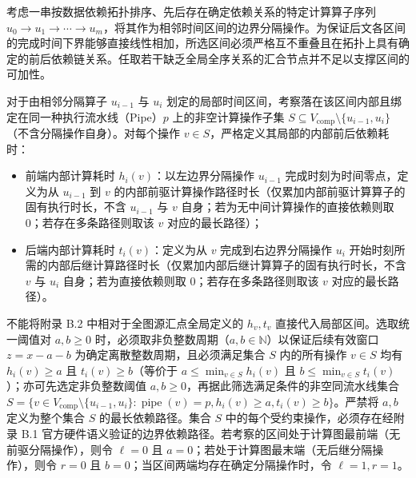 \documentclass[anonymous,notoc]{gmcm2026}
\providecommand{\tightlist}{\setlength{\itemsep}{0pt}\setlength{\parskip}{0pt}}
\begin{document}
考虑一串按数据依赖拓扑排序、先后存在确定依赖关系的特定计算算子序列 \(u_0 \to u_1 \to \cdots \to u_m\)，将其作为相邻时间区间的边界分隔操作。为保证后文各区间的完成时间下界能够直接线性相加，所选区间必须严格互不重叠且在拓扑上具有确定的前后依赖链关系。任取若干缺乏全局全序关系的汇合节点并不足以支撑区间的可加性。

对于由相邻分隔算子 \(u_{i-1}\) 与 \(u_i\) 划定的局部时间区间，考察落在该区间内部且绑定在同一种执行流水线（Pipe）\(p\) 上的非空计算操作子集 \(S \subseteq V_{\mathrm{comp}} \setminus \{u_{i-1}, u_i\}\)（不含分隔操作自身）。对每个操作 \(v \in S\)，严格定义其局部的内部前后依赖耗时：

\begin{itemize}
\tightlist
\item
  前端内部计算耗时 \(h_i(v)\)：以左边界分隔操作 \(u_{i-1}\) 完成时刻为时间零点，定义为从 \(u_{i-1}\) 到 \(v\) 的内部前驱计算操作路径时长（仅累加内部前驱计算算子的固有执行时长，不含 \(u_{i-1}\) 与 \(v\) 自身；若为无中间计算操作的直接依赖则取 0；若存在多条路径则取该 \(v\) 对应的最长路径）；
\item
  后端内部计算耗时 \(t_i(v)\)：定义为从 \(v\) 完成到右边界分隔操作 \(u_i\) 开始时刻所需的内部后继计算路径时长（仅累加内部后继计算算子的固有执行时长，不含 \(v\) 与 \(u_i\) 自身；若为直接依赖则取 0；若存在多条路径则取该 \(v\) 对应的最长路径）。
\end{itemize}

不能将附录 B.2 中相对于全图源汇点全局定义的 \(h_v, t_v\) 直接代入局部区间。选取统一阈值对 \(a, b \ge 0\) 时，必须取非负整数周期（\(a, b \in \mathbb{N}\)）以保证后续有效窗口 \(z = x - a - b\) 为确定离散整数周期，且必须满足集合 \(S\) 内的所有操作 \(v \in S\) 均有 \(h_i(v) \ge a\) 且 \(t_i(v) \ge b\)（等价于 \(a \le \min_{v \in S} h_i(v)\) 且 \(b \le \min_{v \in S} t_i(v)\)）；亦可先选定非负整数阈值 \(a, b \ge 0\)，再据此筛选满足条件的非空同流水线集合 \(S = \{v \in V_{\mathrm{comp}} \setminus \{u_{i-1}, u_i\} : \operatorname{pipe}(v) = p, h_i(v) \ge a, t_i(v) \ge b\}\)。严禁将 \(a, b\) 定义为整个集合 \(S\) 的最长依赖路径。集合 \(S\) 中的每个受约束操作，必须存在经附录 B.1 官方硬件语义验证的边界依赖路径。若考察的区间处于计算图最前端（无前驱分隔操作），则令 \(\ell = 0\) 且 \(a = 0\)；若处于计算图最末端（无后继分隔操作），则令 \(r = 0\) 且 \(b = 0\)；当区间两端均存在确定分隔操作时，令 \(\ell = 1, r = 1\)。
\end{document}
